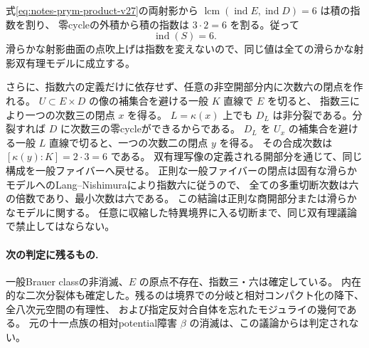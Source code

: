 式\eqref{eq:notes-prym-product-v27}の両射影から
$\operatorname{lcm}(\operatorname{ind}E,\operatorname{ind}D)=6$ は積の指数を割り、
零cycleの外積から積の指数は $3\cdot2=6$ を割る。従って
\[
 \operatorname{ind}(S)=6.
\]
滑らかな射影曲面の点吹上げは指数を変えないので、同じ値は全ての滑らかな射影双有理モデルに成立する。

さらに、指数六の定義だけに依存せず、任意の非空開部分内に次数六の閉点を作れる。
$U\subset E\times D$ の像の補集合を避ける一般 $K$ 直線で $E$ を切ると、
指数三により一つの次数三の閉点 $x$ を得る。
$L=\kappa(x)$ 上でも $D_L$ は非分裂である。分裂すれば $D$ に次数三の零cycleができるからである。
$D_L$ を $U_x$ の補集合を避ける一般 $L$ 直線で切ると、一つの次数二の閉点 $y$ を得る。
その合成次数は $[\kappa(y):K]=2\cdot3=6$ である。
双有理写像の定義される開部分を通じて、同じ構成を一般ファイバーへ戻せる。
正則な一般ファイバーの閉点は固有な滑らかモデルへのLang--Nishimuraにより指数六に従うので、
全ての多重切断次数は六の倍数であり、最小次数は六である。
この結論は正則な商開部分または滑らかなモデルに関する。
任意に収縮した特異境界に入る切断まで、同じ双有理議論で禁止してはならない。



\paragraph{次の判定に残るもの.}
一般Brauer classの非消滅、$E$ の原点不存在、指数三・六は確定している。
内在的な二次分裂体も確定した。残るのは境界での分岐と相対コンパクト化の降下、全八次元空間の有理性、
および指定反対合自体を忘れたモジュライの幾何である。
元の十一点族の相対potential障害 $\beta$ の消滅は、この議論からは判定されない。
